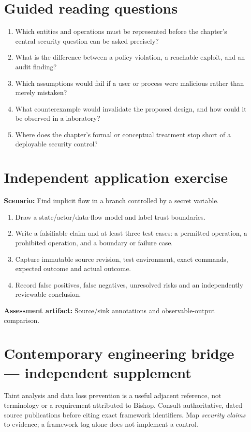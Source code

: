 \documentclass[10pt,letterpaper]{article}
\begin{document}
\section{Guided reading questions}
\begin{enumerate}
\item Which entities and operations must be represented before the chapter's central security question can be asked precisely?
\item What is the difference between a policy violation, a reachable exploit, and an audit finding?
\item Which assumptions would fail if a user or process were malicious rather than merely mistaken?
\item What counterexample would invalidate the proposed design, and how could it be observed in a laboratory?
\item Where does the chapter's formal or conceptual treatment stop short of a deployable security control?
\end{enumerate}
\section{Independent application exercise}
\textbf{Scenario:} Find implicit flow in a branch controlled by a secret variable.
\begin{enumerate}
\item Draw a state/actor/data-flow model and label trust boundaries.
\item Write a falsifiable claim and at least three test cases: a permitted operation, a prohibited operation, and a boundary or failure case.
\item Capture immutable source revision, test environment, exact commands, expected outcome and actual outcome.
\item Record false positives, false negatives, unresolved risks and an independently reviewable conclusion.
\end{enumerate}
\textbf{Assessment artifact:} Source/sink annotations and observable-output comparison.
\section{Contemporary engineering bridge --- independent supplement}
Taint analysis and data loss prevention is a useful adjacent reference, not terminology or a requirement attributed to Bishop. Consult authoritative, dated source publications before citing exact framework identifiers. Map \emph{security claims} to evidence; a framework tag alone does not implement a control.
\end{document}
